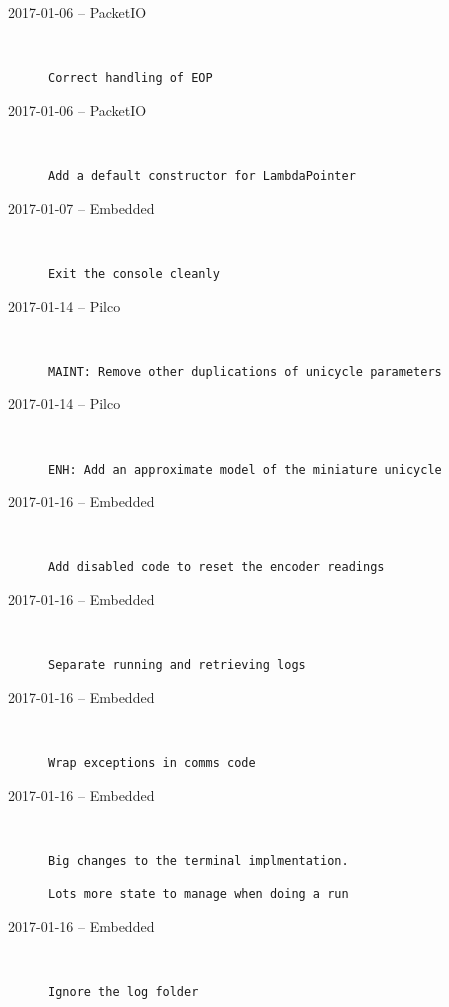 \begin{description}
  \item[2017-01-06 -- PacketIO] \hfill \
\begin{lstlisting}
Correct handling of EOP
\end{lstlisting}


  \item[2017-01-06 -- PacketIO] \hfill \
\begin{lstlisting}
Add a default constructor for LambdaPointer
\end{lstlisting}


  \item[2017-01-07 -- Embedded] \hfill \
\begin{lstlisting}
Exit the console cleanly
\end{lstlisting}


  \item[2017-01-14 -- Pilco] \hfill \
\begin{lstlisting}
MAINT: Remove other duplications of unicycle parameters
\end{lstlisting}


  \item[2017-01-14 -- Pilco] \hfill \
\begin{lstlisting}
ENH: Add an approximate model of the miniature unicycle
\end{lstlisting}


  \item[2017-01-16 -- Embedded] \hfill \
\begin{lstlisting}
Add disabled code to reset the encoder readings
\end{lstlisting}


  \item[2017-01-16 -- Embedded] \hfill \
\begin{lstlisting}
Separate running and retrieving logs
\end{lstlisting}


  \item[2017-01-16 -- Embedded] \hfill \
\begin{lstlisting}
Wrap exceptions in comms code
\end{lstlisting}


  \item[2017-01-16 -- Embedded] \hfill \
\begin{lstlisting}
Big changes to the terminal implmentation.

Lots more state to manage when doing a run
\end{lstlisting}


  \item[2017-01-16 -- Embedded] \hfill \
\begin{lstlisting}
Ignore the log folder
\end{lstlisting}



\end{description}
